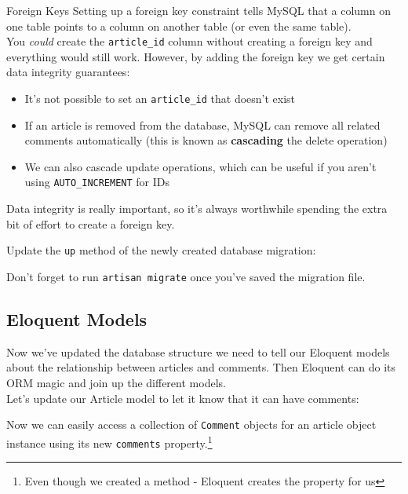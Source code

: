 \begin{infobox}{Foreign Keys}
    Setting up a foreign key constraint tells MySQL that a column on one table points to a column on another table (or even the same table).
    \\

    You \textit{could} create the \texttt{article\_id} column without creating a foreign key and everything would still work. However, by adding the foreign key we get certain data integrity guarantees:

    \begin{itemize}
        \item It's not possible to set an \texttt{article\_id} that doesn't exist
        \item If an article is removed from the database, MySQL can remove all related comments automatically (this is known as \textbf{cascading} the delete operation)
        \item We can also cascade update operations, which can be useful if you aren't using \texttt{AUTO\_INCREMENT} for IDs
    \end{itemize}

    Data integrity is really important, so it's always worthwhile spending the extra bit of effort to create a foreign key.
\end{infobox}

Update the \texttt{up} method of the newly created database migration:


Don't forget to run \texttt{artisan migrate} once you've saved the migration file.


\subsection{Eloquent Models}

Now we've updated the database structure we need to tell our Eloquent models about the relationship between articles and comments. Then Eloquent can do its ORM magic and join up the different models.
\\

Let's update our Article model to let it know that it can have comments:


Now we can easily access a collection of \texttt{Comment} objects for an article object instance using its new \texttt{comments} property.\footnote{Even though we created a method - Eloquent creates the property for us}
\\

